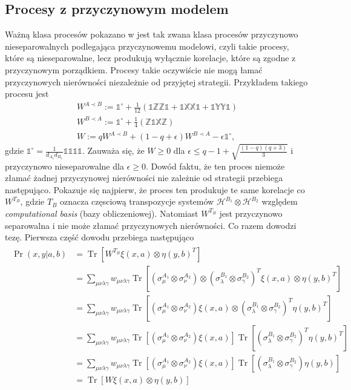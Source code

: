 \documentclass[10pt]{article} %
\DeclareMathOperator{\Trs}{Tr}
\newcommand{\Hx}[1]{\mathcal{H}^{#1}}
\newcommand{\X}{\mathbb{X}}
\newcommand{\Y}{\mathbb{Y}}
\newcommand{\Z}{\mathbb{Z}}
\newcommand{\I}{\mathbb{1}}
\newcommand{\IO}{\mathbb{1}^\circ}
\begin{document}
\subsection{Procesy z przyczynowym modelem}
Ważną klasa procesów pokazano w \cite{causal_model} jest tak zwana klasa procesów przyczynowo nieseparowalnych podlegająca przyczynowemu modelowi, czyli takie procesy, które są nieseparowalne, lecz produkują wyłącznie korelacje, które są zgodne z przyczynowym porządkiem. Procesy takie oczywiście nie mogą
łamać przyczynowych nierówności niezależnie od przyjętej strategii. Przykładem takiego procesu jest 
\begin{gather}
W^{A \prec B} := \IO + \frac{1}{12}(\I\Z\Z\I + \I\X\X\I + \I\Y\Y\I) \\
W^{B \prec A} := \IO + \frac{1}{4}(\Z\I\X\Z)\\
\label{eq:nsep_causal}
W := qW^{A \prec B} + (1-q+\epsilon)W^{B \prec A} -\epsilon\IO,
\end{gather} gdzie $\IO = \frac{1}{d_{A_1}d_{B_1}} \I\I\I\I$.
Zauważa się, że $W \geq 0$ dla $\epsilon \leq q- 1 + \sqrt{\frac{(1-q)(q+3)}{3}}$ i przyczynowo nieseparowalne dla $\epsilon \geq 0$. 
Dowód faktu, że ten proces niemoże złamać żadnej przyczynowej nierówności nie zależnie od strategii przebiega następująco.
Pokazuje się najpierw, że proces ten produkuje te same korelacje co $W^{T_B}$, gdzie $T_B$ oznacza częsciową transpozycje systemów $\Hx{B_1} \otimes \Hx{B_2}$ względem \textit{computational basis} (bazy obliczeniowej). Natomiast $W^{T_B}$ jest przyczynowo separowalna i nie może złamać przyczynowych nierówności. Co razem dowodzi tezę. Pierwsza część dowodu przebiega następująco 
\begin{align}
\begin{split}
\Pr(x,y|a,b) &= \Trs\left[W^{T_B} \xi(x,a) \otimes \eta(y,b)^{T}\right] \\
	&= \sum_{\mu\nu\lambda\gamma} w_{\mu\nu\lambda\gamma} \Trs \left[ (\sigma_\mu^{A_1}\otimes\sigma_\nu^{A_2})\otimes(\sigma_\lambda^{B_1}\otimes\sigma_\gamma^{B_2})^T \xi(x,a) \otimes \eta(y,b)^{T} \right] \\
	&= \sum_{\mu\nu\lambda\gamma} w_{\mu\nu\lambda\gamma} \Trs \left[ (\sigma_\mu^{A_1}\otimes\sigma_\nu^{A_2}) \xi(x,a) \otimes (\sigma_\lambda^{B_1}\otimes\sigma_\gamma^{B_2})^T\eta(y,b)^{T} \right] \\
	&= \sum_{\mu\nu\lambda\gamma} w_{\mu\nu\lambda\gamma}  \Trs \left[ (\sigma_\mu^{A_1}\otimes\sigma_\nu^{A_2}) \xi(x,a)\right] \Trs \left[ (\sigma_\lambda^{B_1}\otimes\sigma_\gamma^{B_2})^T\eta(y,b)^{T} \right] \\
	&= \sum_{\mu\nu\lambda\gamma} w_{\mu\nu\lambda\gamma}  \Trs \left[ (\sigma_\mu^{A_1}\otimes\sigma_\nu^{A_2}) \xi(x,a)\right] \Trs \left[ (\sigma_\lambda^{B_1}\otimes\sigma_\gamma^{B_2})\eta(y,b) \right] \\
	&=  \Trs\left[W \xi(x,a) \otimes \eta(y,b)\right]
\end{split}
\end{align}
\end{document}
